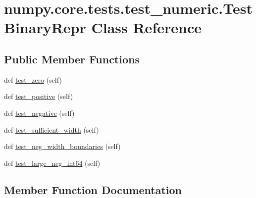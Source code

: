 \hypertarget{classnumpy_1_1core_1_1tests_1_1test__numeric_1_1TestBinaryRepr}{}\section{numpy.\+core.\+tests.\+test\+\_\+numeric.\+Test\+Binary\+Repr Class Reference}
\label{classnumpy_1_1core_1_1tests_1_1test__numeric_1_1TestBinaryRepr}
\subsection*{Public Member Functions}
\begin{DoxyCompactItemize}
\item 
def \hyperlink{classnumpy_1_1core_1_1tests_1_1test__numeric_1_1TestBinaryRepr_a9f9d8691c45f9b39f301572771b2570f}{test\+\_\+zero} (self)
\item 
def \hyperlink{classnumpy_1_1core_1_1tests_1_1test__numeric_1_1TestBinaryRepr_a5f7c6c4e41ccda312747737c74e142ee}{test\+\_\+positive} (self)
\item 
def \hyperlink{classnumpy_1_1core_1_1tests_1_1test__numeric_1_1TestBinaryRepr_a580b93d831fac26bf07c02086a5bd301}{test\+\_\+negative} (self)
\item 
def \hyperlink{classnumpy_1_1core_1_1tests_1_1test__numeric_1_1TestBinaryRepr_aa03184fc6d4bb184ca90bf6cfab6e01b}{test\+\_\+sufficient\+\_\+width} (self)
\item 
def \hyperlink{classnumpy_1_1core_1_1tests_1_1test__numeric_1_1TestBinaryRepr_a9c0ab78d80f0b873401972dc19e35785}{test\+\_\+neg\+\_\+width\+\_\+boundaries} (self)
\item 
def \hyperlink{classnumpy_1_1core_1_1tests_1_1test__numeric_1_1TestBinaryRepr_a2168a7833f5162c5a20852a13fe9fd54}{test\+\_\+large\+\_\+neg\+\_\+int64} (self)
\end{DoxyCompactItemize}


\subsection{Member Function Documentation}
\mbox{\label{classnumpy_1_1core_1_1tests_1_1test__numeric_1_1TestBinaryRepr_a2168a7833f5162c5a20852a13fe9fd54}} 
